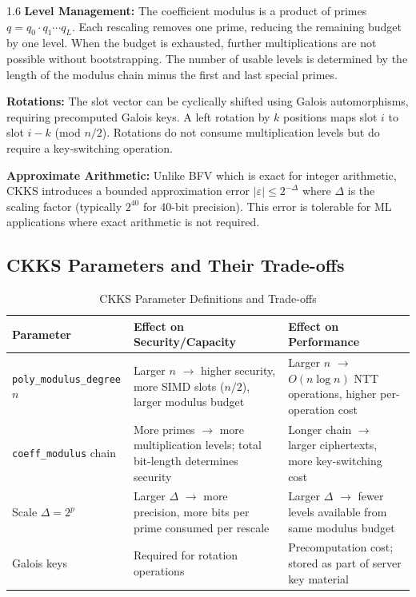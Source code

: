 \begin{spacing}{1.6}
\textbf{Level Management:} The coefficient modulus is a product of primes
$q = q_0 \cdot q_1 \cdots q_L$. Each rescaling removes one prime, reducing
the remaining budget by one level. When the budget is exhausted, further
multiplications are not possible without bootstrapping. The number of usable
levels is determined by the length of the modulus chain minus the first and
last special primes.

\textbf{Rotations:} The slot vector can be cyclically shifted using Galois
automorphisms, requiring precomputed Galois keys. A left rotation by $k$
positions maps slot $i$ to slot $i-k$ (mod $n/2$). Rotations do not consume
multiplication levels but do require a key-switching operation.

\textbf{Approximate Arithmetic:} Unlike BFV which is exact for integer
arithmetic, CKKS introduces a bounded approximation error $|\varepsilon|
\leq 2^{-\Delta}$ where $\Delta$ is the scaling factor (typically $2^{40}$
for 40-bit precision). This error is tolerable for ML applications where
exact arithmetic is not required.

\subsection{CKKS Parameters and Their Trade-offs}

\begin{table}[H]
\centering
\caption{CKKS Parameter Definitions and Trade-offs}
\label{tab:ckks_params}
\begin{tabular}{p{3.5cm}p{4cm}p{4cm}}
\toprule
\textbf{Parameter} & \textbf{Effect on Security/Capacity} & \textbf{Effect on Performance} \\
\midrule
\texttt{poly\_modulus\_degree} $n$ &
Larger $n$ $\to$ higher security, more SIMD slots ($n/2$), larger modulus budget &
Larger $n$ $\to$ $O(n \log n)$ NTT operations, higher per-operation cost \\
\midrule
\texttt{coeff\_modulus} chain &
More primes $\to$ more multiplication levels; total bit-length determines security &
Longer chain $\to$ larger ciphertexts, more key-switching cost \\
\midrule
Scale $\Delta = 2^p$ &
Larger $\Delta$ $\to$ more precision, more bits per prime consumed per rescale &
Larger $\Delta$ $\to$ fewer levels available from same modulus budget \\
\midrule
Galois keys &
Required for rotation operations &
Precomputation cost; stored as part of server key material \\
\bottomrule
\end{tabular}
\end{table}


\end{spacing}
